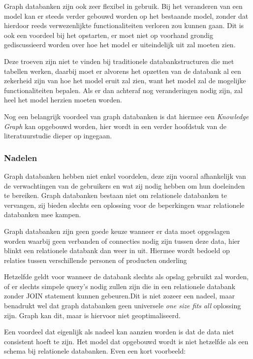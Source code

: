 \newpage
Graph databanken zijn ook zeer flexibel in gebruik. Bij het veranderen van een model kan er steeds verder gebouwd worden op het bestaande model, zonder dat hierdoor reeds verwezenlijkte functionaliteiten verloren zou kunnen gaan.
Dit is ook een voordeel bij het opstarten, er moet niet op voorhand grondig gediscussieerd worden over hoe het model er uiteindelijk uit zal moeten zien.

Deze troeven zijn niet te vinden bij traditionele databankstructuren die met tabellen werken, daarbij moet er alvorens het opzetten van de databank al een zekerheid zijn van hoe het model eruit zal zien, want het model zal de mogelijke functionaliteiten bepalen. Als er dan achteraf nog veranderingen nodig zijn, zal heel het model herzien moeten worden.

Nog een belangrijk voordeel van graph databanken is dat hiermee een \textit{Knowledge Graph} kan opgebouwd worden, hier wordt in een verder hoofdstuk van de literatuurstudie dieper op ingegaan.

\subsubsection{Nadelen}
\label{subsec: Nadelen Graph}

Graph databanken hebben niet enkel voordelen, deze zijn vooral afhankelijk van de verwachtingen van de gebruikers en wat zij nodig hebben om hun doeleinden te bereiken. Graph databanken bestaan niet om relationele databanken te vervangen, zij bieden slechts een oplossing voor de beperkingen waar relationele databanken mee kampen.

Graph databanken zijn geen goede keuze wanneer er data moet opgeslagen worden waarbij geen verbanden of connecties nodig zijn tussen deze data, hier blinkt een relationele databank dan weer in uit.  Hiermee wordt bedoeld op relaties tussen verschillende personen of producten onderling

Hetzelfde geldt voor wanneer de databank slechts als opslag gebruikt zal worden, of er slechts simpele query's nodig zullen zijn die in een relationele databank zonder JOIN statement kunnen gebeuren.Dit is niet zozeer een nadeel, maar benadrukt wel dat graph databanken geen universele \textit{one size fits all} oplossing zijn. Graph kan dit, maar is hiervoor niet geoptimaliseerd.

Een voordeel dat eigenlijk als nadeel kan aanzien worden is dat de data niet consistent hoeft te zijn. Het model dat opgebouwd wordt is niet hetzelfde als een schema bij relationele databanken. Even een kort voorbeeld:

